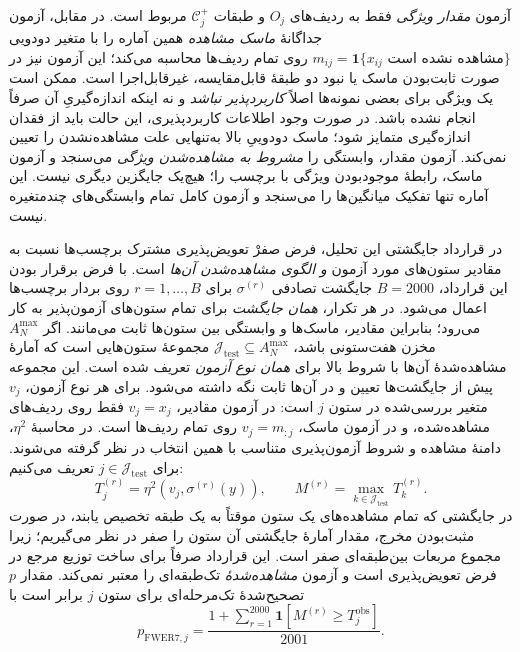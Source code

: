 آزمون \emph{مقدار ویژگی}
فقط به ردیف‌های $O_j$ و
طبقات $\mathcal C_j^+$ مربوط است.
در مقابل، آزمون جداگانهٔ
\emph{ماسک مشاهده}
همین آماره را با
متغیر دودویی
$m_{ij}=\mathbf{1}
\{x_{ij}\text{ مشاهده نشده است}\}$
روی تمام ردیف‌ها محاسبه می‌کند؛
این آزمون نیز در صورت ثابت‌بودن
ماسک یا نبود دو طبقهٔ قابل‌مقایسه،
غیرقابل‌اجرا است.
ممکن است یک ویژگی برای بعضی نمونه‌ها
اصلاً \emph{کاربردپذیر نباشد}
و نه اینکه اندازه‌گیریِ آن صرفاً انجام نشده باشد.
در صورت وجود اطلاعات کاربردپذیری،
این حالت باید از فقدان اندازه‌گیری
متمایز شود؛ ماسک دودوییِ بالا به‌تنهایی
علت مشاهده‌نشدن را تعیین نمی‌کند.
آزمون مقدار، وابستگی را
\emph{مشروط به مشاهده‌شدن ویژگی}
می‌سنجد و آزمون ماسک، رابطهٔ
موجودبودن ویژگی با برچسب را؛
هیچ‌یک جایگزین دیگری نیست.
این آماره تنها تفکیک میانگین‌ها
را می‌سنجد و آزمون کامل
تمام وابستگی‌های چندمتغیره نیست.

در قرارداد جایگشتی این تحلیل،
فرض صفرْ تعویض‌پذیری مشترک برچسب‌ها
نسبت به مقادیر ستون‌های مورد آزمون
\emph{و الگوی مشاهده‌شدن آن‌ها} است.
با فرض برقرار بودن این قرارداد،
$B=2000$ جایگشت
تصادفی $\sigma^{(r)}$
برای $r=1,\ldots,B$
روی بردار برچسب‌ها
اعمال می‌شود.
در هر تکرار،
\emph{همان جایگشت}
برای تمام ستون‌های آزمون‌پذیر
به کار می‌رود؛
بنابراین مقادیر،
ماسک‌ها و وابستگی بین
ستون‌ها ثابت می‌مانند.
اگر $A_N^{\max}$
مخزن هفت‌ستونی باشد،
$\mathcal J_{\mathrm{test}}\subseteq A_N^{\max}$
مجموعهٔ ستون‌هایی است که
آمارهٔ مشاهده‌شدهٔ آن‌ها با شروط بالا
برای \emph{همان نوع آزمون} تعریف شده است.
این مجموعه پیش از جایگشت‌ها تعیین
و در آن‌ها ثابت نگه داشته می‌شود.
برای هر نوع آزمون، $v_j$ متغیر بررسی‌شده
در ستون $j$ است: در آزمون مقادیر،
$v_j=x_j$ فقط روی ردیف‌های مشاهده‌شده،
و در آزمون ماسک، $v_j=m_{:j}$
روی تمام ردیف‌ها است.
در محاسبهٔ $\eta^2$، دامنهٔ مشاهده و
شروط آزمون‌پذیری متناسب با همین انتخاب
در نظر گرفته می‌شوند. برای
$j\in\mathcal J_{\mathrm{test}}$ تعریف می‌کنیم:
\begin{equation}
\label{cmp:eq:ch4-e14-maxt}
T_j^{(r)}
=\eta^2(v_j,\sigma^{(r)}(y)),
\qquad
M^{(r)}
=\max_{k\in\mathcal J_{\mathrm{test}}}
T_k^{(r)}.
\end{equation}
در جایگشتی که تمام مشاهده‌های یک ستون
موقتاً به یک طبقه تخصیص یابند،
در صورت مثبت‌بودن مخرج، مقدار
آمارهٔ جایگشتی آن ستون را صفر
در نظر می‌گیریم؛ زیرا مجموع مربعات
بین‌طبقه‌ای صفر است.
این قرارداد صرفاً برای ساخت توزیع مرجع
در فرض تعویض‌پذیری است و آزمون
\emph{مشاهده‌شدهٔ} تک‌طبقه‌ای را
معتبر نمی‌کند.
مقدار $p$ تصحیح‌شدهٔ
تک‌مرحله‌ای برای ستون $j$
برابر است با
\begin{equation}
\label{cmp:eq:ch4-e14-p-fwer7}
p_{\mathrm{FWER7},j}
=\frac{
1+\sum_{r=1}^{2000}
\mathbf{1}
\left[M^{(r)}\ge
T_j^{\mathrm{obs}}\right]
}{2001}.
\end{equation}
